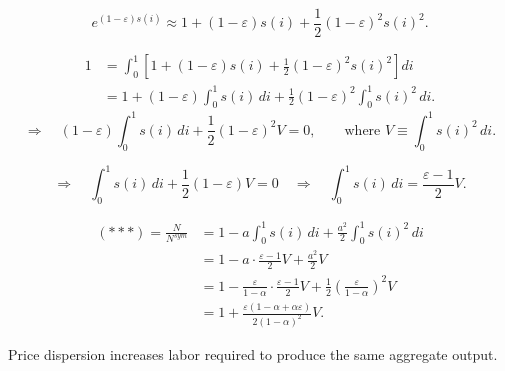 \documentclass[11pt,fleqn]{article}
\newcommand{\green}[1]{\textcolor{noteGreen}{#1}}
\begin{document}
\[
e^{\left(1-\varepsilon\right)s\left(i\right)}
\approx
1+\left(1-\varepsilon\right)s\left(i\right)
+\frac12\left(1-\varepsilon\right)^2 s\left(i\right)^2.
\]

\begin{align*}
1
&=
\int_0^1
\left[
1+\left(1-\varepsilon\right)s\left(i\right)
+\frac12\left(1-\varepsilon\right)^2 s\left(i\right)^2
\right]di
\\[2pt]
&=
1+\left(1-\varepsilon\right)\int_0^1 s\left(i\right)\,di
+\frac12\left(1-\varepsilon\right)^2\int_0^1 s\left(i\right)^2\,di.
\end{align*}
\[
\Rightarrow\quad
\left(1-\varepsilon\right)\int_0^1 s\left(i\right)\,di
+\frac12\left(1-\varepsilon\right)^2 V=0,
\qquad
\text{where }
V \equiv \int_0^1 s\left(i\right)^2\,di .
\]

\[
\Rightarrow\quad
\int_0^1 s\left(i\right)\,di
+\frac12\left(1-\varepsilon\right)V=0
\quad\Rightarrow\quad
\int_0^1 s\left(i\right)\,di
=
\frac{\varepsilon-1}{2}V.
\]

\begin{equation}
\begin{aligned}
\left(\ast\ast\ast\right)
=\frac{N}{N^{sym}}
&=
1-a\int_0^1 s\left(i\right)\,di
+\frac{a^2}{2}\int_0^1 s\left(i\right)^2\,di
\\[2pt]
&=
1-a\cdot\frac{\varepsilon-1}{2}V
+\frac{a^2}{2}V
\\[2pt]
&=
1-\frac{\varepsilon}{1-\alpha}\cdot\frac{\varepsilon-1}{2}V
+\frac12\left(\frac{\varepsilon}{1-\alpha}\right)^2V
\\[2pt]
&=
1+
\frac{\varepsilon\left(1-\alpha+\alpha\varepsilon\right)}
{2\left(1-\alpha\right)^2}V.
\end{aligned}
\tag{$\ast\ast\ast\ast$}
\end{equation}

\green{Price dispersion increases labor required to produce the same aggregate output.}
\end{document}
